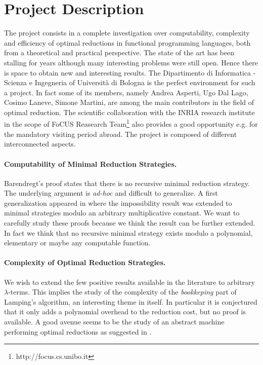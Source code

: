 \documentclass[english]{scrartcl}
\begin{document}
\section{Project Description}
The project consists in a complete investigation over computability, complexity and efficiency of optimal reductions in functional programming languages, both from a theoretical and practical perspective. The state of the art has been stalling for years although many interesting problems were still open. Hence there is space to obtain new and interesting results. The Dipartimento di Informatica - Scienza e Ingegneria of Università di Bologna is the perfect environment for such a project. In fact some of its members, namely Andrea Asperti, Ugo Dal Lago, Cosimo Laneve, Simone Martini, are among the main contributors in the field of optimal reduction. The scientific collaboration with the INRIA research institute in the scope of FoCUS Reasearch Team\footnote{http://focus.cs.unibo.it} also provides a good opportunity e.g. for the mandatory visiting period abroad. The project is composed of different interconnected aspects.
\paragraph{Computability of Minimal Reduction Strategies.}Barendregt's proof \cite[Section~13.5]{barendregt_lambda_1984} states that there is no recursive minimal reduction strategy. The underlying argument is \emph{ad-hoc} and difficult to generalize. A first generalization appeared in \cite[Appendix]{kathail_optimal_1990} where the impossibility result was extended to minimal strategies modulo an arbitrary multiplicative constant. We want to carefully study these proofs because we think the result can be further extended. In fact we think that no recursive minimal strategy exists modulo a polynomial, elementary or maybe any computable function.
\paragraph{Complexity of Optimal Reduction Strategies.}We wish to extend the few positive results available in the literature \cite{baillot_light_2011,guerrini_is_2017} to arbitrary $\lambda$-terms. This implies the study of the complexity of the \emph{bookkeping} part of Lamping's algorithm, an interesting theme in itself. In particular it is conjectured that it only adds a polynomial overhead to the reduction cost, but no proof is available. A good avenue seems to be the study of an abstract machine performing optimal reductions as suggested in \cite{danos_reversible_1999}. 
\end{document}
